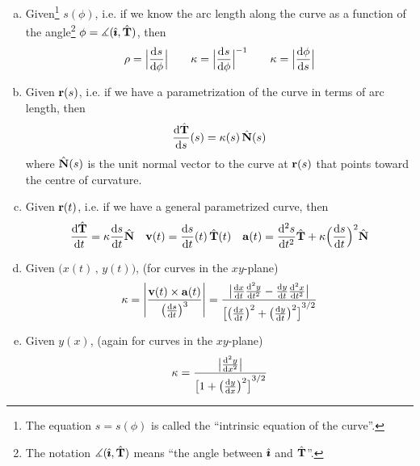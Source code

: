 \begin{theorem}\label{thm:curvatureFormulae}

\begin{enumerate}[(a)]
\item 
Given\footnote{The equation $s=s(\phi)$ is called the ``intrinsic 
equation of the curve''.} $s(\phi)$,
i.e. if we know the arc length along the curve as a function of 
the angle\footnote{The notation $\measuredangle(\hat{\pmb{\imath}},\hat{\mathbf{T}})$
means ``the angle between $\hat{\pmb{\imath}}$ and $\hat{\mathbf{T}}$''.} 
$\phi=\measuredangle(\hat{\pmb{\imath}},\hat{\mathbf{T}})$, then
\begin{equation*}
\rho = \Big|\diff{s}{\phi}\Big|\qquad
\ka = \Big|\diff{s}{\phi}\Big|^{-1}\qquad
\ka = \Big|\diff{\phi}{s}\Big|
\end{equation*}

\item\label{thm:curvatureFormulae:part:b}
Given $\mathbf{r}(s)$,
i.e. if we have a parametrization of the curve in terms of arc length, then
\begin{equation*}
\diff{\hat\vT}{s}(s) = \ka(s)\,\hat\vN(s)
\end{equation*}
where $\hat{\mathbf{N}}(s)$ is the unit normal vector to the curve at $\mathbf{r}(s)$
that points toward the centre of curvature.

\item\label{thm:curvatureFormulae:part:c}
Given $\mathbf{r}(t)$, i.e. if we have a general parametrized curve,
then
\begin{align*}
\diff{\hat\vT}{t} = \ka \diff{s}{t} \hat\vN\quad
\vv(t) =  \diff{s}{t}(t)\,\hat\vT(t) \quad
\va(t) %
       =  \difftwo{s}{t}\hat\vT
                           + \ka\Big(\diff{s}{t}\Big)^2\hat\vN
\end{align*}

\item 
Given $\big(x(t)\,,\,y(t)\big)$, (for curves in the $xy$-plane)
\begin{equation*}
\ka = \left|\frac{\vv(t)\times\va(t)}{\big(\diff{s}{t}\big)^3}\right|
=\frac{\big|\diff{x}{t}\difftwo{y}{t}-\diff{y}{t}\difftwo{x}{t}\big|}
{ {\big[\big(\diff{x}{t}\big)^2+\big(\diff{y}{t}\big)^2\big]}^{3/2} }
\end{equation*}


\item\label{thm:curvatureFormulae:part:e}
Given $y(x)$, (again for curves in the $xy$-plane)
\begin{equation*}
\ka 
=\frac{\big|\difftwo{y}{x}\big|}
{ {\big[1+\big(\diff{y}{x}\big)^2\big]}^{3/2} }
\end{equation*}

\end{enumerate}
\end{theorem}

